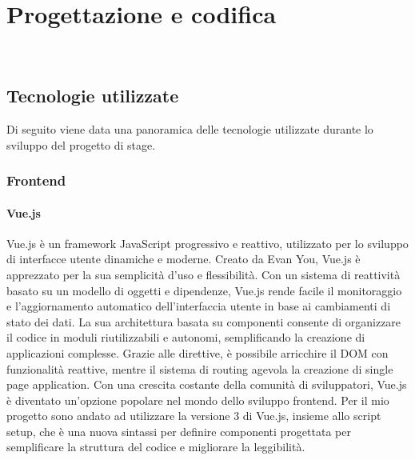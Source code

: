 \chapter{Progettazione e codifica}
\label{cap:progettazione-codifica}

\\

\section{Tecnologie utilizzate}
\label{sec:tecnologie-strumenti}

Di seguito viene data una panoramica delle tecnologie utilizzate durante lo sviluppo del progetto di stage.

\subsection{Frontend}\label{subsec:frontend}
\subsubsection{Vue.js}\label{subsubsec:vue}
Vue.js è un framework JavaScript progressivo e reattivo, utilizzato per lo sviluppo di interfacce utente dinamiche e moderne. 
Creato da Evan You, Vue.js è apprezzato per la sua semplicità d'uso e flessibilità. Con un sistema di reattività basato su un modello di oggetti e dipendenze, 
Vue.js rende facile il monitoraggio e l'aggiornamento automatico dell'interfaccia utente in base ai cambiamenti di stato dei dati. La sua architettura basata 
su componenti consente di organizzare il codice in moduli riutilizzabili e autonomi, semplificando la creazione di applicazioni complesse. 
Grazie alle direttive, è possibile arricchire il DOM con funzionalità reattive, mentre il sistema di routing agevola la creazione di single page application. 
Con una crescita costante della comunità di sviluppatori, Vue.js è diventato un'opzione popolare nel mondo dello sviluppo frontend.
Per il mio progetto sono andato ad utilizzare la versione 3 di Vue.js, insieme allo script setup, che è una nuova sintassi per definire componenti progettata per semplificare la struttura del codice e migliorare la leggibilità.


